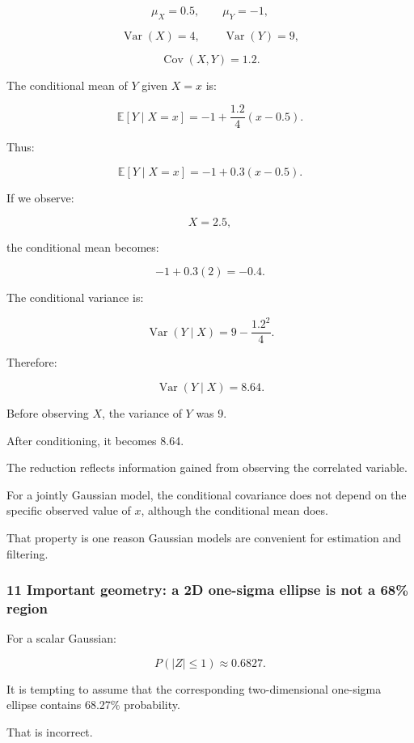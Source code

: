 \[
 \mu_X=0.5,\qquad \mu_Y=-1,
\]

\[
 \operatorname{Var}(X)=4,\qquad \operatorname{Var}(Y)=9,
\]

\[
 \operatorname{Cov}(X,Y)=1.2.
\]

The conditional mean of \(Y\) given \(X=x\) is:

\[
 \mathbb E[Y\mid X=x] = -1+\frac{1.2}{4}(x-0.5).
\]

Thus:

\[
 \boxed{ \mathbb E[Y\mid X=x] = -1+0.3(x-0.5) }.
\]

If we observe:

\[
 X=2.5,
\]

the conditional mean becomes:

\[
 -1+0.3(2) =\boxed{-0.4}.
\]

The conditional variance is:

\[
 \operatorname{Var}(Y\mid X) = 9-\frac{1.2^2}{4}.
\]

Therefore:

\[
 \boxed{ \operatorname{Var}(Y\mid X)=8.64 }.
\]

Before observing \(X\), the variance of \(Y\) was 9.

After conditioning, it becomes 8.64.

The reduction reflects information gained from observing the correlated variable.

For a jointly Gaussian model, the conditional covariance does not depend on the specific observed value of \(x\), although the conditional mean does.

That property is one reason Gaussian models are convenient for estimation and filtering.

\subsubsection{11 Important geometry: a 2D one-sigma ellipse is not a 68\% region}\label{02-foundations-ii-ch024-important-geometry-a-2d-one-sigma-ellipse-is-not-a-68-region}

\hypertarget{02-foundations-ii-ch024-important-geometry-a-2d-one-sigma-ellipse-is-not-a-68-region}{}

For a scalar Gaussian:

\[
 P(|Z|\le1)\approx0.6827.
\]

It is tempting to assume that the corresponding two-dimensional one-sigma ellipse contains 68.27\% probability.

That is incorrect.

